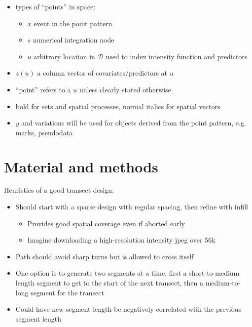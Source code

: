 \documentclass[review]{elsarticle}
\begin{document}
\begin{itemize}
\item types of ``points'' in space:
\begin{itemize}
\item \(x\) event in the point pattern
\item \(s\) numerical integration node
\item \(u\) arbitrary location in \(\mathcal{D}\) used to index intensity
function and predictors
\end{itemize}

\item \(z(u)\) a column vector of covariates/predictors at \(u\)

\item ``point'' refers to a \(u\) unless clearly stated otherwise

\item bold for sets and spatial processes, normal italics for spatial vectors

\item \(y\) and variations will be used for objects derived from the point
pattern, e.g. marks, pseudodata

\end{itemize}


\section{Material and methods}


Heuristics of a good transect design:
\begin{itemize}
\item Should start with a sparse design with regular spacing, then refine with
infill
\begin{itemize}
\item Provides good spatial coverage even if aborted early
\item Imagine downloading a high-resolution intensity jpeg over 56k
\end{itemize}
\item Path should avoid sharp turns but is allowed to cross itself
\item One option is to generate two segments at a time, first a short-to-medium
length segment to get to the start of the next transect, then a  medium-to-long
segment for the transect
\item Could have new segment length be negatively correlated with the previous
segment length
\end{itemize}
\end{document}
